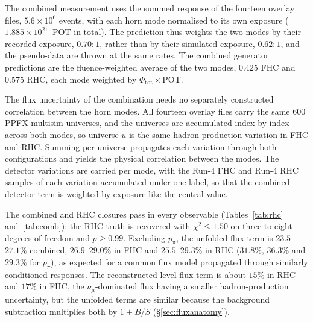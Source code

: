 \documentclass[11pt,a4paper]{article}
\begin{document}
The combined measurement uses the summed response of the fourteen overlay files,
$5.6\times10^{6}$ events, with each horn mode normalised to its own exposure
($1.885\times10^{21}$~POT in total). The prediction thus weights the two modes by their recorded
exposure, $0.70{:}1$, rather than by their simulated exposure, $0.62{:}1$, and the pseudo-data are
thrown at the same rates. The combined generator predictions are the fluence-weighted average of the
two modes, $0.425$ FHC and $0.575$ RHC, each mode weighted by $\Phi_\mathrm{tot}\times$POT.

The flux uncertainty of the combination needs no separately constructed correlation between the
horn modes. All fourteen overlay files carry the same $600$ PPFX multisim universes, and the
universes are accumulated index by index across both modes, so universe $u$ is the same
hadron-production variation in FHC and RHC. Summing per universe propagates each variation through
both configurations and yields the physical correlation between the modes. The detector variations
are carried per mode, with the Run-4 FHC and Run-4 RHC samples of each variation accumulated under
one label, so that the combined detector term is weighted by exposure like the central value.

The combined and RHC closures pass in every observable (Tables~\ref{tab:rhc} and~\ref{tab:comb}):
the RHC truth is recovered with $\chi^2\le1.50$ on three to eight degrees of freedom and $p\ge0.99$.
Excluding $p_\pi$, the unfolded flux term is $23.5$--$27.1\%$ combined, $26.9$--$29.0\%$ in FHC and
$25.5$--$29.3\%$ in RHC ($31.8\%$, $36.3\%$ and $29.3\%$ for $p_\pi$), as expected for a common flux
model propagated through similarly conditioned responses. The
reconstructed-level flux term is about $15\%$ in RHC and $17\%$ in FHC, the $\bar\nu_\mu$-dominated
flux having a smaller hadron-production uncertainty, but the unfolded terms are similar because the
background subtraction multiplies both by $1+B/S$ (\S\ref{sec:fluxanatomy}).
\end{document}
